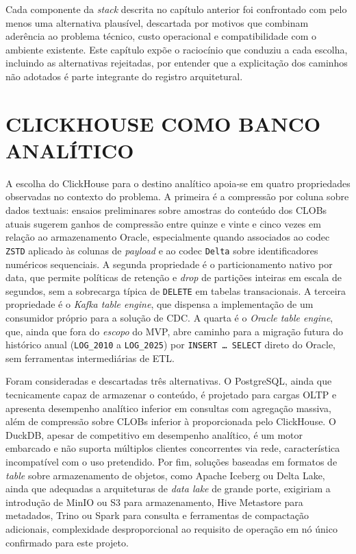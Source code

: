 \documentclass[12pt,letterpaper,oneside]{report}
\begin{document}
Cada componente da \textit{stack} descrita no capítulo anterior foi confrontado com pelo menos uma alternativa plausível, descartada por motivos que combinam aderência ao problema técnico, custo operacional e compatibilidade com o ambiente existente. Este capítulo expõe o raciocínio que conduziu a cada escolha, incluindo as alternativas rejeitadas, por entender que a explicitação dos caminhos não adotados é parte integrante do registro arquitetural.

\section{CLICKHOUSE COMO BANCO ANALÍTICO}

A escolha do ClickHouse para o destino analítico apoia-se em quatro propriedades observadas no contexto do problema. A primeira é a compressão por coluna sobre dados textuais: ensaios preliminares sobre amostras do conteúdo dos CLOBs atuais sugerem ganhos de compressão entre quinze e vinte e cinco vezes em relação ao armazenamento Oracle, especialmente quando associados ao codec \texttt{ZSTD} aplicado às colunas de \textit{payload} e ao codec \texttt{Delta} sobre identificadores numéricos sequenciais. A segunda propriedade é o particionamento nativo por data, que permite políticas de retenção e \textit{drop} de partições inteiras em escala de segundos, sem a sobrecarga típica de \texttt{DELETE} em tabelas transacionais. A terceira propriedade é o \textit{Kafka table engine}, que dispensa a implementação de um consumidor próprio para a solução de CDC. A quarta é o \textit{Oracle table engine}, que, ainda que fora do \textit{escopo} do MVP, abre caminho para a migração futura do histórico anual (\texttt{LOG\_2010} a \texttt{LOG\_2025}) por \texttt{INSERT \dots\ SELECT} direto do Oracle, sem ferramentas intermediárias de ETL.

Foram consideradas e descartadas três alternativas. O PostgreSQL, ainda que tecnicamente capaz de armazenar o conteúdo, é projetado para cargas OLTP e apresenta desempenho analítico inferior em consultas com agregação massiva, além de compressão sobre CLOBs inferior à proporcionada pelo ClickHouse. O DuckDB, apesar de competitivo em desempenho analítico, é um motor embarcado e não suporta múltiplos clientes concorrentes via rede, característica incompatível com o uso pretendido. Por fim, soluções baseadas em formatos de \textit{table} sobre armazenamento de objetos, como Apache Iceberg ou Delta Lake, ainda que adequadas a arquiteturas de \textit{data lake} de grande porte, exigiriam a introdução de MinIO ou S3 para armazenamento, Hive Metastore para metadados, Trino ou Spark para consulta e ferramentas de compactação adicionais, complexidade desproporcional ao requisito de operação em nó único confirmado para este projeto.
\end{document}
